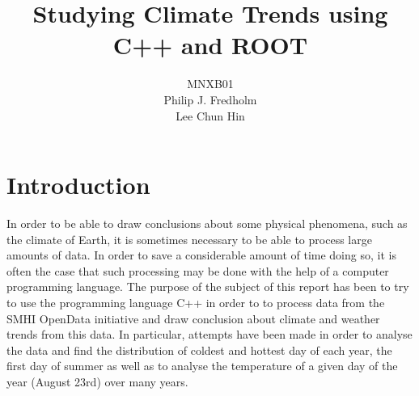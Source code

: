 \documentclass[a4, 12pt]{article}
\title{Studying Climate Trends using C++ and ROOT}
\author{MNXB01 \\ Philip J. Fredholm \\Lee Chun Hin }
\begin{document}
\maketitle
\tableofcontents
\newpage

\section{Introduction}
In order to be able to draw conclusions about some physical phenomena, such as the climate of Earth, it is sometimes necessary to be able to process large amounts of data. In order to save a considerable amount of time doing so, it is often the case that such processing may be done with the help of a computer programming language. The purpose of the subject of this report has been to try to use the programming language C++ in order to to process data from the SMHI OpenData initiative and draw conclusion about climate and weather trends from this data. In particular, attempts have been made in order to analyse the data and find the distribution of coldest and hottest day of each year, the first day of summer as well as to analyse the temperature of a given day of the year (August 23rd) over many years.
\end{document}

